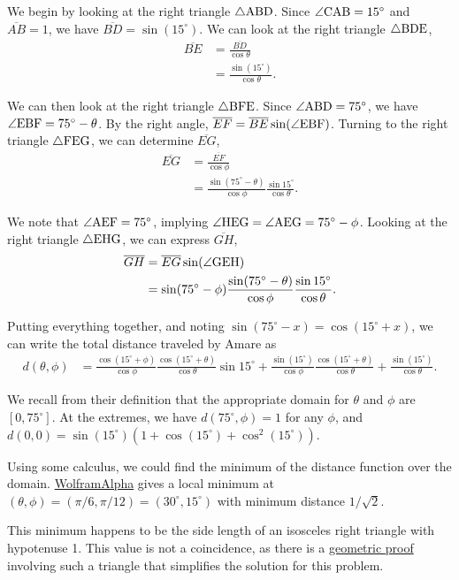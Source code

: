 \documentclass[reqno]{amsart}
\begin{document}
We begin by looking at the right triangle $\triangle {\rm ABD}$. Since $\angle{\rm CAB}=15^\circ$ and $\overline{AB}=1$, we have $\overline{BD}=\sin(15^\circ)$. We can look at the right triangle $\triangle{\rm BDE}$, 
\begin{align*}
\overline{BE} &= \frac{\overline{BD}}{\cos \theta} \\
&= \frac{\sin(15^\circ)}{\cos\theta}.
\end{align*}

We can then look at the right triangle $\triangle{\rm BFE}$. Since $\angle{\rm ABD}=75^\circ$, we have $\angle{\rm EBF}=75^\circ-\theta$. By the right angle, $\overline{EF}=\overline{BE} \sin(\angle{\rm EBF})$. Turning to the right triangle $\triangle{\rm FEG}$, we can determine $\overline{EG}$, 
\begin{align*}
\overline{EG} &= \frac{\overline{EF}}{\cos \phi} \\
&= \frac{\sin(75^\circ-\theta)}{\cos \phi}\frac{\sin15^\circ}{\cos\theta}.
\end{align*}

We note that $\angle{\rm AEF}=75^\circ$, implying $\angle{\rm HEG}=\angle{\rm AEG} = 75^\circ-\phi$. Looking at the right triangle $\triangle{\rm EHG}$, we can express $\overline{GH}$, 
\begin{align*}
\overline{GH}&= \overline{EG}\sin(\angle{\rm GEH}) \\
&= \sin(75^\circ-\phi) \frac{\sin(75^\circ-\theta)}{\cos \phi}\frac{ \sin 15^\circ}{\cos\theta}.
\end{align*}

Putting everything together, and noting $\sin(75^\circ-x)=\cos(15^\circ+x)$, we can write the total distance traveled by Amare as 
\begin{align*}
d(\theta, \phi) &= \frac{\cos(15^\circ+\phi)}{\cos \phi} \frac{\cos(15^\circ+\theta)}{\cos\theta} \sin 15^\circ + \frac{\sin(15^\circ)}{\cos \phi} \frac{\cos(15^\circ+\theta)}{\cos\theta} + \frac{\sin(15^\circ)}{\cos\theta}.
\end{align*}

We recall from their definition that the appropriate domain for $\theta$ and $\phi$ are $[0, 75^\circ]$. At the extremes, we have $d(75^\circ, \phi) = 1$ for any $\phi$, and $d(0,0) = \sin(15^\circ)(1+\cos(15^\circ)+\cos^2(15^\circ))$. 

Using some calculus, we could find the minimum of the distance function over the domain. \href{https://www.wolframalpha.com/input/?i=minimize+\%28cos\%28pi\%2F12\%2Bphi\%29\%2Fcos\%28phi\%29*cos\%28pi\%2F12\%2Btheta\%29\%2Fcos\%28theta\%29*sin\%28pi\%2F12\%29\%2Bsin\%28pi\%2F12\%29\%2Fcos\%28phi\%29*cos\%28pi\%2F12\%2Btheta\%29\%2Fcos\%28theta\%29\%2Bsin\%28pi\%2F12\%29\%2Fcos\%28theta\%29\%29}{WolframAlpha} gives a local minimum at $(\theta, \phi)=(\pi/6, \pi/12) = (30^\circ, 15^\circ)$ with minimum distance $1/\sqrt{2}$. 

This minimum happens to be the side length of an isosceles right triangle with hypotenuse 1. This value is not a coincidence, as there is a \href{https://laurentlessard.com/bookproofs/triangle-trek/}{geometric proof} involving such a triangle that simplifies the solution for this problem. 
\end{document}
